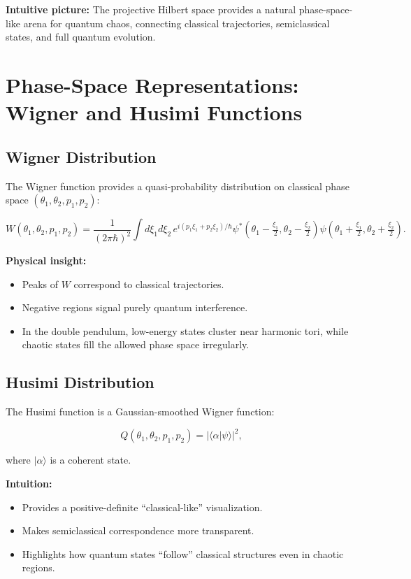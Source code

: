 \documentclass[11pt]{book}
\begin{document}
\textbf{Intuitive picture:} The projective Hilbert space provides a natural phase-space-like arena
for quantum chaos, connecting classical trajectories, semiclassical states, 
and full quantum evolution.


\chapter{Phase-Space Representations: Wigner and Husimi Functions}

\section{Wigner Distribution}

The Wigner function provides a quasi-probability distribution on classical phase space $(\theta_1,\theta_2,p_1,p_2)$:

\[
W(\theta_1,\theta_2,p_1,p_2) = \frac{1}{(2\pi \hbar)^2} \int d\xi_1 d\xi_2 \, 
e^{i(p_1 \xi_1 + p_2 \xi_2)/\hbar} 
\psi^*(\theta_1 - \tfrac{\xi_1}{2}, \theta_2 - \tfrac{\xi_2}{2}) 
\psi(\theta_1 + \tfrac{\xi_1}{2}, \theta_2 + \tfrac{\xi_2}{2}).
\]

\textbf{Physical insight:}  
\begin{itemize}
   \item Peaks of $W$ correspond to classical trajectories.  
    \item  Negative regions signal purely quantum interference.  
    \item  In the double pendulum, low-energy states cluster 
               near harmonic tori, while chaotic states fill the allowed 
               phase space irregularly.
\end{itemize}

\section{Husimi Distribution}

The Husimi function is a Gaussian-smoothed Wigner function:

\[
Q(\theta_1,\theta_2,p_1,p_2) = |\langle \alpha | \psi \rangle|^2,
\]

where $|\alpha\rangle$ is a coherent state.  

\textbf{Intuition:}  
\begin{itemize}
   \item  Provides a positive-definite “classical-like” visualization.  
   \item  Makes semiclassical correspondence more transparent.  
    \item  Highlights how quantum states “follow” classical structures even in chaotic regions.
\end{itemize}
\end{document}
